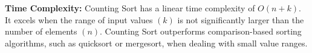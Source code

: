 \documentclass[preview]{standalone}
\begin{document}
\begin{center}
\textbf{Time Complexity:} Counting Sort has a linear time complexity of $O(n + k)$. It excels when the range of input values $(k)$ is not significantly larger than the number of elements $(n)$. Counting Sort outperforms comparison-based sorting algorithms, such as quicksort or mergesort, when dealing with small value ranges.
\end{center}
\end{document}
